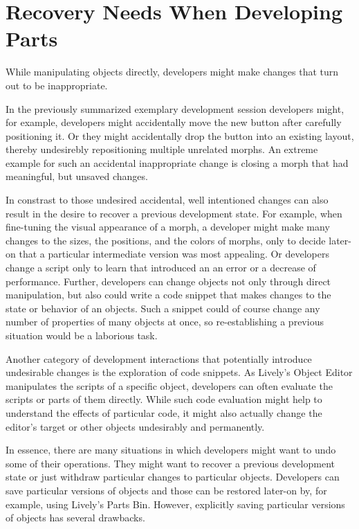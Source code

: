 

\section{Recovery Needs When Developing Parts}

While manipulating objects directly, developers might make changes that turn out to be inappropriate.

In the previously summarized exemplary development session developers might, for example, developers might accidentally move the new button after carefully positioning it.
Or they might accidentally drop the button into an existing layout, thereby undesirebly repositioning multiple unrelated morphs.
An extreme example for such an accidental inappropriate change is closing a morph that had meaningful, but unsaved changes.

In constrast to those undesired accidental, well intentioned changes can also result in the desire to recover a previous development state.
For example, when fine-tuning the visual appearance of a morph, a developer might make many changes to the sizes, the positions, and the colors of morphs, only to decide later-on that a particular intermediate version was most appealing.
Or developers change a script only to learn that introduced an an error or a decrease of performance.
Further, developers can change objects not only through direct manipulation, but also could write a code snippet that makes changes to the state or behavior of an objects.
Such a snippet could of course change any number of properties of many objects at once, so re-establishing a previous situation would be a laborious task.

Another category of development interactions that potentially introduce undesirable changes is the exploration of code snippets.
As Lively's Object Editor manipulates the scripts of a specific object, developers can often evaluate the scripts or parts of them directly.
While such code evaluation might help to understand the effects of particular code, it might also actually change the editor's target or other objects undesirably and permanently.

In essence, there are many situations in which developers might want to undo some of their operations.
They might want to recover a previous development state or just withdraw particular changes to particular objects.
Developers can save particular versions of objects and those can be restored later-on by, for example, using Lively's Parts Bin.
However, explicitly saving particular versions of objects has several drawbacks.
